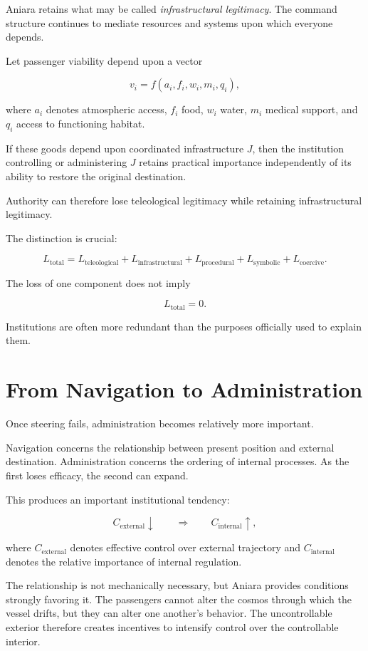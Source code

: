 \documentclass[11pt,oneside]{book}
\theoremstyle{definition}
\theoremstyle{remark}
\begin{document}
Aniara retains what may be called \emph{infrastructural legitimacy}. The command structure continues to mediate resources and systems upon which everyone depends.

Let passenger viability depend upon a vector

\[
v_i
=
f(
a_i,
f_i,
w_i,
m_i,
q_i
),
\]

where \(a_i\) denotes atmospheric access, \(f_i\) food, \(w_i\) water, \(m_i\) medical support, and \(q_i\) access to functioning habitat.

If these goods depend upon coordinated infrastructure \(J\), then the institution controlling or administering \(J\) retains practical importance independently of its ability to restore the original destination.

Authority can therefore lose teleological legitimacy while retaining infrastructural legitimacy.

The distinction is crucial:

\[
L_{\mathrm{total}}
=
L_{\mathrm{teleological}}
+
L_{\mathrm{infrastructural}}
+
L_{\mathrm{procedural}}
+
L_{\mathrm{symbolic}}
+
L_{\mathrm{coercive}}.
\]

The loss of one component does not imply

\[
L_{\mathrm{total}}=0.
\]

Institutions are often more redundant than the purposes officially used to explain them.

\section{From Navigation to Administration}

Once steering fails, administration becomes relatively more important.

Navigation concerns the relationship between present position and external destination. Administration concerns the ordering of internal processes. As the first loses efficacy, the second can expand.

This produces an important institutional tendency:

\[
C_{\mathrm{external}}\downarrow
\qquad\Longrightarrow\qquad
C_{\mathrm{internal}}\uparrow,
\]

where \(C_{\mathrm{external}}\) denotes effective control over external trajectory and \(C_{\mathrm{internal}}\) denotes the relative importance of internal regulation.

The relationship is not mechanically necessary, but Aniara provides conditions strongly favoring it. The passengers cannot alter the cosmos through which the vessel drifts, but they can alter one another's behavior. The uncontrollable exterior therefore creates incentives to intensify control over the controllable interior.
\end{document}
